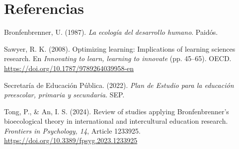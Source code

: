 \documentclass[spanish,letterpaper,oneside]{article}
\begin{document}
\section*{Referencias}
{\setlength{\parskip}{6pt}
\par\hangindent=1.27cm  Bronfenbrenner, U. (1987). \textit{La ecología del desarrollo humano}. Paidós.
\par\hangindent=1.27cm  Sawyer, R. K. (2008). Optimizing learning: Implications of learning sciences research. En \textit{Innovating to learn, learning to innovate} (pp. 45--65). OECD. \url{https://doi.org/10.1787/9789264039958-en}
\par\hangindent=1.27cm  Secretaría de Educación Pública. (2022). \textit{Plan de Estudio para la educación preescolar, primaria y secundaria}. SEP.
\par\hangindent=1.27cm  Tong, P., \& An, I. S. (2024). Review of studies applying Bronfenbrenner’s bioecological theory in international and intercultural education research. \textit{Frontiers in Psychology, 14}, Article 1233925. \url{https://doi.org/10.3389/fpsyg.2023.1233925}
}
\end{document}
